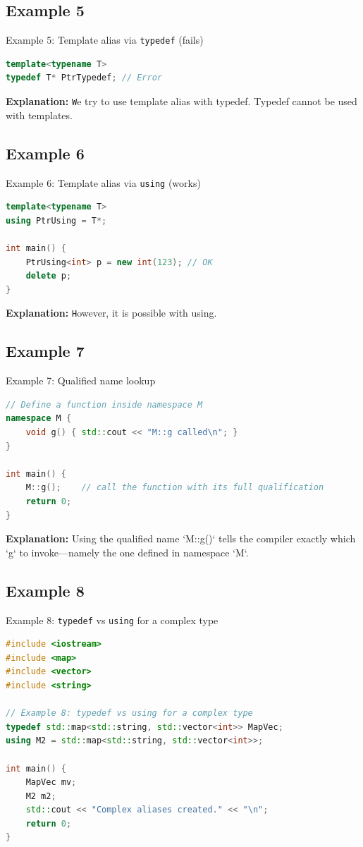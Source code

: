 \documentclass{beamer}
\begin{document}
\subsection{Example 5}
\begin{frame}[fragile]{Example 5: Template alias via \texttt{typedef} (fails)}
\begin{lstlisting}[language=C++]
template<typename T>
typedef T* PtrTypedef; // Error
\end{lstlisting}
\textbf{Explanation:}
\texttt We try to use template alias with typedef. Typedef cannot be used with templates.
\end{frame}

\subsection{Example 6}
\begin{frame}[fragile]{Example 6: Template alias via \texttt{using} (works)}
\begin{lstlisting}[language=C++]
template<typename T>
using PtrUsing = T*;

int main() {
    PtrUsing<int> p = new int(123); // OK
    delete p;
}
\end{lstlisting}
\textbf{Explanation:}
\texttt However, it is possible with using.
\end{frame}
\subsection{Example 7}
\begin{frame}[fragile]{Example 7: Qualified name lookup}
\begin{lstlisting}[language=C++]
// Define a function inside namespace M
namespace M {
    void g() { std::cout << "M::g called\n"; }
}

int main() {
    M::g();    // call the function with its full qualification
    return 0;
}
\end{lstlisting}

\textbf{Explanation:}
Using the qualified name `M::g()` tells the compiler exactly which `g` to invoke—namely the one defined in namespace `M`.
\end{frame}
\subsection{Example 8}
\begin{frame}[fragile]{Example 8: \texttt{typedef} vs \texttt{using} for a complex type}
\begin{lstlisting}[language=C++]
#include <iostream>
#include <map>
#include <vector>
#include <string>

// Example 8: typedef vs using for a complex type
typedef std::map<std::string, std::vector<int>> MapVec;
using M2 = std::map<std::string, std::vector<int>>;

int main() {
    MapVec mv;
    M2 m2;
    std::cout << "Complex aliases created." << "\n";
    return 0;
}
\end{lstlisting}
\end{frame}
\end{document}
